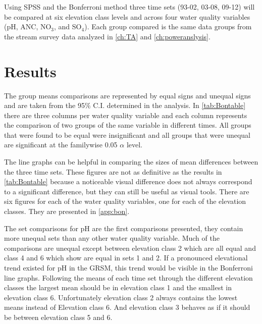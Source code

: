 Using SPSS and the Bonferroni method three time sets (93-02, 03-08, 09-12) will be compared at six elevation class levels and across four water quality variables (pH, ANC, NO$_3$, and SO$_4 $).
Each group compared is the same data groups from the stream survey data analyzed in \autoref{ch:TA} and \autoref{ch:poweranslysis}.

\section{Results}


The group means comparisons are represented by equal signs and unequal signs and are taken from the 95$\%$ C.I. determined in the analysis.
In \autoref{tab:Bontable} there are three columns per water quality variable and each column represents the comparison of two groups of the same variable in different times.
All groups that were found to be equal were insignificant and all groups that were unequal are significant at the familywise 0.05 $\alpha$ level.

The line graphs can be helpful in comparing the sizes of mean differences between the three time sets.
These figures are not as definitive as the results in \autoref{tab:Bontable} because a noticeable visual difference does not always correspond to a significant difference, but they can still be useful as visual tools.
There are six figures for each of the water quality variables, one for each of the elevation classes.
They are presented in \autoref{app:bon}.


The set comparisons for pH are the first comparisons presented, they contain more unequal sets than any other water quality variable.
Much of the comparisons are unequal except between elevation class 2 which are all equal and class 4 and 6 which show are equal in sets 1 and 2.
If a pronounced elevational trend existed for pH in the GRSM, this trend would be visible in the Bonferroni line graphs.
Following the means of each time set through the different elevation classes the largest mean should be in elevation class 1 and the smallest in elevation class 6.
Unfortunately elevation class 2 always contains the lowest means instead of Elevation class 6.
And elevation class 3 behaves as if it should be between elevation class 5 and 6.

